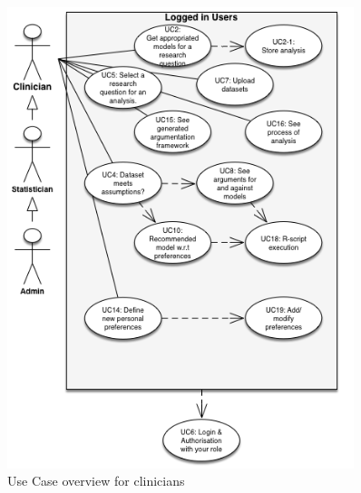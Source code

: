 \begin{figure}[!h]
\centering
\includegraphics[width=0.9\textwidth]{figures/use_case_clinician}
\caption{Use Case overview for clinicians}
\label{fig:usecase:clinician}
\end{figure}

